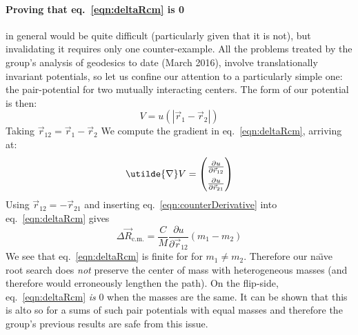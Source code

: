 \documentclass[letter,11pt]{article}
\newcommand{\cvec}[1]{\utilde{#1}}
\newcommand{\svec}[1]{\vec{#1}}
\newcommand{\laeq}[1]{\label{eqn:#1}}
\newcommand{\refeq}[1]{eq.~\ref{eqn:#1}}
\newcommand{\Rcm}{\svec{R}_{\textrm{c.m.}}}
\begin{document}
\paragraph{Proving that \refeq{deltaRcm} is 0} in general would  be quite difficult (particularly given that it is not), but invalidating it requires only one counter-example. All the problems treated by the group's analysis of geodesics to date (March 2016), involve translationally invariant potentials, so let us confine our attention to a particularly simple one: the pair-potential for two mutually interacting centers. The form of our potential is then:
\begin{equation}
V = u(\left|\svec{r}_1 - \svec{r}_2\right|)
\end{equation}
Taking $\svec{r}_{12} = \svec{r}_1 - \svec{r}_2$ We compute the gradient in \refeq{deltaRcm}, arriving at:
\begin{equation} \laeq{counterDerivative}
\renewcommand*{\arraystretch}{1.5}
\cvec{\nabla}V =
\begin{pmatrix}
\frac{\partial u}{\partial \svec{r}_{12}} \\
\frac{\partial u}{\partial \svec{r}_{21}}
\end{pmatrix}
\end{equation}
Using $\svec{r}_{12} = - \svec{r}_{21}$ and inserting \refeq{counterDerivative} into \refeq{deltaRcm} gives
\begin{equation}
  \Delta\Rcm = \frac{C}{M}\frac{\partial u}{\partial \svec{r}_{12}} \left( m_1 -  m_2 \right) 
\end{equation}
We see that \refeq{deltaRcm} is finite for  for $m_1 \neq m_2$. Therefore our na{\"\i}ve root search does \emph{not} preserve the center of mass with heterogeneous masses (and therefore would erroneously lengthen the path). On the flip-side, \refeq{deltaRcm} \emph{is} 0 when the masses are the same. It can be shown that this is alto so for a sums of such pair potentials with equal masses and therefore the group's previous results are safe from this issue.
\end{document}
